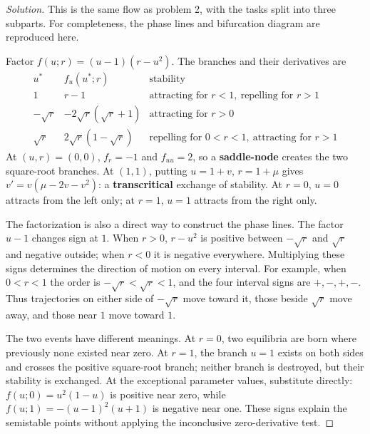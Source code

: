 \documentclass[10pt]{amsart}
\newenvironment{solution}
{\begin{proof}[Solution]}
{\end{proof}}
\begin{document}
\begin{enumerate}[label=\arabic*), leftmargin=*, itemsep=1em]
\begin{solution}
This is the same flow as problem 2, with the tasks split into three subparts. For completeness, the phase lines and bifurcation diagram are reproduced here.

Factor $f(u;r)=(u-1)(r-u^2)$. The branches and their derivatives are
\[
\begin{array}{c|c|c}
 u^*&f_u(u^*;r)&\text{stability}\\\hline
 1&r-1&\text{attracting for }r<1,\ \text{repelling for }r>1\\
 -\sqrt r&-2\sqrt r(\sqrt r+1)&\text{attracting for }r>0\\
 \sqrt r&2\sqrt r(1-\sqrt r)&\text{repelling for }0<r<1,\ \text{attracting for }r>1
\end{array}
\]
At $(u,r)=(0,0)$, $f_r=-1$ and $f_{uu}=2$, so a \textbf{saddle-node} creates the two square-root branches. At $(1,1)$, putting $u=1+v$, $r=1+\mu$ gives $v'=v(\mu-2v-v^2)$: a \textbf{transcritical} exchange of stability. At $r=0$, $u=0$ attracts from the left only; at $r=1$, $u=1$ attracts from the right only.

The factorization is also a direct way to construct the phase lines. The factor $u-1$ changes sign at $1$. When $r>0$, $r-u^2$ is positive between $-\sqrt r$ and $\sqrt r$ and negative outside; when $r<0$ it is negative everywhere. Multiplying these signs determines the direction of motion on every interval. For example, when $0<r<1$ the order is $-\sqrt r<\sqrt r<1$, and the four interval signs are $+,-,+,-$. Thus trajectories on either side of $-\sqrt r$ move toward it, those beside $\sqrt r$ move away, and those near $1$ move toward $1$.

The two events have different meanings. At $r=0$, two equilibria are born where previously none existed near zero. At $r=1$, the branch $u=1$ exists on both sides and crosses the positive square-root branch; neither branch is destroyed, but their stability is exchanged. At the exceptional parameter values, substitute directly: $f(u;0)=u^2(1-u)$ is positive near zero, while $f(u;1)=-(u-1)^2(u+1)$ is negative near one. These signs explain the semistable points without applying the inconclusive zero-derivative test.


\end{solution}
\end{enumerate}
\end{document}
